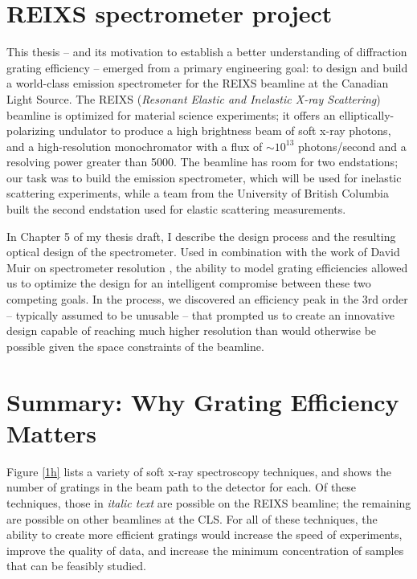 \section{REIXS spectrometer project}
This thesis -- and its motivation to establish a better understanding of diffraction grating efficiency -- emerged from a primary engineering goal: to design and build a world-class emission spectrometer for the REIXS beamline at the Canadian Light Source.  The REIXS (\emph{Resonant Elastic and Inelastic X-ray Scattering}) beamline is optimized for material science experiments; it offers an elliptically-polarizing undulator to produce a high brightness beam of soft x-ray photons, and a high-resolution monochromator with a flux of $\sim10^{13}$ photons/second and a resolving power greater than 5000.  The beamline has room for two endstations; our task was to build the emission spectrometer, which will be used for inelastic scattering experiments, while a team from the University of British Columbia built the second endstation used for elastic scattering measurements.

In Chapter 5 of my thesis draft, I describe the design process and the resulting optical design of the spectrometer.  Used in combination with the work of David Muir on spectrometer resolution \cite{Mui06}, the ability to model grating efficiencies allowed us to optimize the design for an intelligent compromise between these two competing goals.  In the process, we discovered an efficiency peak in the 3rd order -- typically assumed to be unusable -- that prompted us to create an innovative design capable of reaching much higher resolution than would otherwise be possible given the space constraints of the beamline.



 \section{Summary: Why Grating Efficiency Matters}
 Figure \ref{1h} lists a variety of soft x-ray spectroscopy techniques, and shows the number of gratings in the beam path to the detector for each.  Of these techniques, those in \emph{italic text} are possible on the REIXS beamline; the remaining are possible on other beamlines at the CLS.  For all of these techniques, the ability to create more efficient gratings would increase the speed of experiments, improve the quality of data, and increase the minimum concentration of samples that can be feasibly studied.
 
